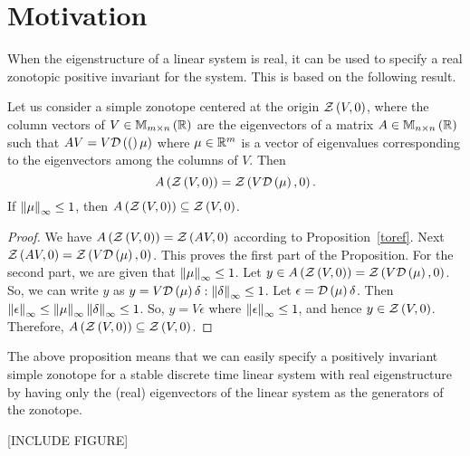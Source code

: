 \section{Motivation}
When the eigenstructure of a linear system is real, it can be used to
specify a real zonotopic positive invariant for the system.  This is
based on the following result.
%
\begin{proposition}
Let us consider a simple zonotope centered at the origin
$\mathit{\mathcal{Z}}\left(V,0\right)$, where the column vectors of $V\in\mathbb{M}_{m\times n}\left(\mathbb{R}\right)$
are the eigenvectors of a matrix $A\in\mathbb{M}_{n\times n}\left(\mathbb{R}\right)$ such that
$AV = V\mathcal{D}\left((\right)\mu)$ where $\mu\in\mathbb{R}^m$ is a vector of eigenvalues
corresponding to the eigenvectors among the columns of $V$.
Then \[A\left(\mathit{\mathcal{Z}}\left(V,0\right)\right) = \mathit{\mathcal{Z}}\left(V\mathcal{D}\left(\mu\right),0\right).\] If
$\left\|\mu\right\|_{\infty}\leq 1$, then
$A\left(\mathit{\mathcal{Z}}\left(V,0\right)\right)\subseteq \mathit{\mathcal{Z}}\left(V,0\right)$.
\end{proposition}
\begin{proof}
We have $A\left(\mathit{\mathcal{Z}}\left(V,0\right)\right) = \mathit{\mathcal{Z}}\left(AV,0\right)$ according to
Proposition~\ref{toref}.  Next $\mathit{\mathcal{Z}}\left(AV,0\right)
= \mathit{\mathcal{Z}}\left(V\mathcal{D}\left(\mu\right),0\right)$.  This proves the first part of the
Proposition.  For the second part, we are given that
$\left\|\mu\right\|_{\infty}\leq 1$.  Let $y\in A\left(\mathit{\mathcal{Z}}\left(V,0\right)\right)
= \mathit{\mathcal{Z}}\left(V\mathcal{D}\left(\mu\right),0\right)$.  So, we can write $y$ as $y =
V\mathcal{D}\left(\mu\right)\delta:\left\|\delta\right\|_{\infty}\leq 1$.  Let $\epsilon
= \mathcal{D}\left(\mu\right)\delta$. Then
$\left\|\epsilon\right\|_{\infty} \leq \left\|\mu\right\|_{\infty}\left\|\delta\right\|_{\infty} \leq 1$.  So,
$y=V\epsilon$ where $\left\|\epsilon\right\|_{\infty}\leq 1$,
and hence $y\in \mathit{\mathcal{Z}}\left(V,0\right)$.  Therefore,
$A\left(\mathit{\mathcal{Z}}\left(V,0\right)\right)\subseteq \mathit{\mathcal{Z}}\left(V,0\right)$.
\end{proof}
%
The above proposition means that we can easily specify a positively
invariant simple zonotope for a stable discrete time linear system
with real eigenstructure by having only the (real) eigenvectors of the linear
system as the generators of the zonotope.

[INCLUDE FIGURE]



